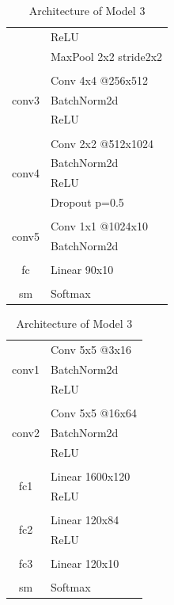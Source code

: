 \documentclass{article}
\begin{document}
\begin{table}[htbp]
\begin{minipage}[t]{0.48\textwidth}
\begin{tabular}{c|l}
          & ReLU  \\
          & MaxPool 2x2 stride2x2 \\\hline \\ [-1.5ex]
    \multirow{3}[0]{*}{conv3} & Conv 4x4 @256x512 \\
          & BatchNorm2d \\
          & ReLU  \\\hline \\ [-1.5ex]
    \multirow{4}[0]{*}{conv4} & Conv 2x2 @512x1024 \\
          & BatchNorm2d \\
          & ReLU  \\
          & Dropout p=0.5 \\\hline \\ [-1.5ex]
    \multirow{2}[0]{*}{conv5} & Conv 1x1 @1024x10 \\
          & BatchNorm2d \\\hline \\ [-1.5ex]
    fc    & Linear 90x10 \\\hline \\ [-1.5ex]
    sm    & Softmax \\
    \end{tabular}%
  \label{tab:2}%

 \vspace{10em}
       \centering
        \caption{Architecture of Model 3}
          \begin{tabular}{cl}
          \multirow{3}[0]{*}{conv1} & Conv 5x5 @3x16 \\
                & BatchNorm2d \\
                & ReLU  \\ \hline \\ [-1.5ex]
          \multirow{3}[0]{*}{conv2} & Conv 5x5 @16x64 \\
                & BatchNorm2d \\
                & ReLU  \\ \hline \\ [-1.5ex]
          \multirow{2}[0]{*}{fc1} & Linear 1600x120 \\
                & ReLU  \\ \hline \\ [-1.5ex]
          \multirow{2}[0]{*}{fc2} & Linear 120x84 \\
                & ReLU  \\\hline \\ [-1.5ex]
          fc3   & Linear 120x10 \\\hline \\ [-1.5ex]
          sm    & Softmax \\
          \end{tabular}%
        \label{tab:3}%
      
  \end{minipage}
  
\end{table}%
\end{document}
